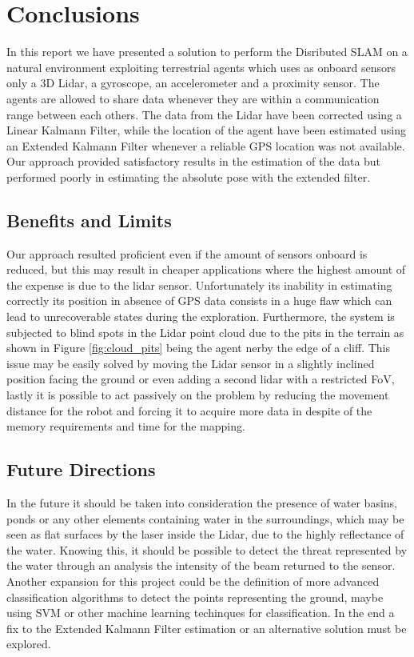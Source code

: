 \documentclass[twocolumn, a4paper]{article}
\begin{document}
\section{Conclusions}
In this report we have presented a solution to perform the Disributed SLAM
on a natural environment exploiting terrestrial agents which uses as onboard
sensors only a 3D Lidar, a gyroscope, an accelerometer and a proximity sensor.
The agents are allowed to share data whenever they are within a communication
range between each others.
The data from the Lidar have been corrected using a Linear Kalmann Filter,
while the location of the agent have been estimated using an Extended
Kalmann Filter whenever a reliable GPS location was not available.
Our approach provided satisfactory results in the estimation of the 
data but performed poorly in estimating the absolute pose with the extended
filter.

\subsection{Benefits and Limits}
Our approach resulted proficient even if the amount of sensors onboard is
reduced, but this may result in cheaper applications where the highest
amount of the expense is due to the lidar sensor.
Unfortunately its inability in estimating correctly its position in absence
of GPS data consists in a huge flaw which can lead to unrecoverable states
during the exploration.
Furthermore, the system is subjected to blind spots in the Lidar point
cloud due to the pits in the terrain as shown in Figure \ref{fig:cloud_pits}
being the agent nerby the edge of a cliff.
This issue may be easily solved by moving the Lidar sensor in a slightly
inclined position facing the ground or even adding a second lidar with
a restricted FoV, lastly it is possible to act passively on the problem
by reducing the movement distance for the robot and forcing it to acquire
more data in despite of the memory requirements and time for the mapping.

\subsection{Future Directions}
In the future it should be taken into consideration the presence of water
basins, ponds or any other elements containing water in the surroundings, which
may be seen as flat surfaces by the laser inside the Lidar, due to the highly
reflectance of the water. Knowing this, it should be possible to detect the
threat represented by the water through an analysis the intensity of the beam
returned to the sensor.
Another expansion for this project could be the definition of more advanced
classification algorithms to detect the points representing the ground, maybe
using SVM or other machine learning techinques for classification.
In the end a fix to the Extended Kalmann Filter estimation or an
alternative solution must be explored.
\end{document}
